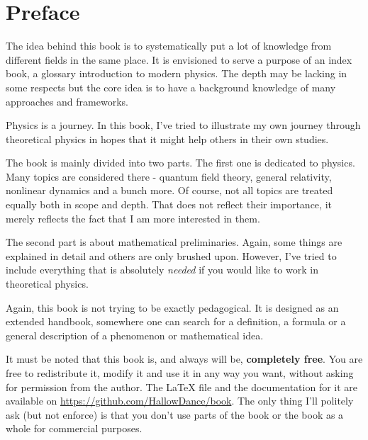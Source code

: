 \chapter*{Preface}
The idea behind this book is to systematically put a lot of knowledge from different fields in the same place. It is envisioned to serve a purpose of an index book, a glossary introduction to modern physics. The depth may be lacking in some respects but the core idea is to have a background knowledge of many approaches and frameworks.

Physics is a journey. In this book, I've tried to illustrate my own journey
through theoretical physics in hopes that it might help others in their own
studies. 

The book is mainly divided into two parts. The first one is dedicated to
physics. Many topics are considered there - quantum field theory, general
relativity, nonlinear dynamics and a bunch more. Of course, not all topics are
treated equally both in scope and depth. That does not reflect their
importance, it merely reflects the fact that I am more interested in them.
\par The second part is about mathematical preliminaries. Again, some things
are explained in detail and others are only brushed upon. However, I've tried
to include everything that is absolutely \textit{needed} if you would like to
work in theoretical physics.
\par Again, this book is not trying to be exactly pedagogical. It is designed
as an extended handbook, somewhere one can search for a definition, a formula
or a general description of a phenomenon or mathematical idea.
\par It must be noted that this book is, and always will be,
\textbf{completely free}.
You are free to redistribute it, modify it and use it in any way you want,
without asking for permission from the author. The LaTeX file and the
documentation for it are available on
\url{https://github.com/HallowDance/book}. The only thing I'll politely ask
(but not enforce) is that you don't use parts of the book or the book as
a whole for commercial purposes. 


